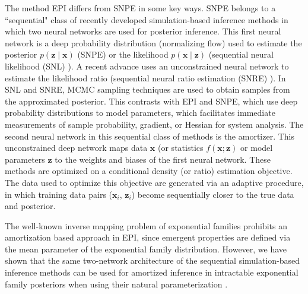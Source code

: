 \documentclass[11pt]{article}
\begin{document}
The method EPI differs from SNPE in some key ways.
SNPE belongs to a ``sequential" class of recently developed simulation-based inference methods in which two neural networks are used for posterior inference.
This first neural network is a deep probability distribution (normalizing flow) used to estimate the posterior $p(\mathbf{z} \mid \mathbf{x})$ (SNPE) or the likelihood  $p(\mathbf{x} \mid \mathbf{z})$ (sequential neural likelihood (SNL) \cite{papamakarios2019sequential}).
A recent advance uses an unconstrained neural network to estimate the likelihood ratio (sequential neural ratio estimation (SNRE) \cite{hermans2020likelihood}).
In SNL and SNRE, MCMC sampling techniques are used to obtain samples from the approximated posterior.
This contrasts with EPI and SNPE, which use deep probability distributions to model parameters, which facilitates immediate measurements of sample probability, gradient, or Hessian for system analysis.
The second neural network in this sequential class of methods is the amortizer.  This unconstrained deep network maps data $\mathbf{x}$ (or statistics $f(\mathbf{x}; \mathbf{z})$ or model parameters $\mathbf{z}$ to the weights and biases of the first neural network.
These methods are optimized on a conditional density (or ratio) estimation objective.
The data used to optimize this objective are generated via an adaptive procedure, in which training data pairs ($\mathbf{x}_i$, $\mathbf{z}_i$) become sequentially closer to the true data and posterior.

The well-known inverse mapping problem of exponential families \cite{wainwright2008graphical} prohibits an amortization based approach in EPI, since emergent properties are defined via the mean parameter of the exponential family distribution.
However, we have shown that the same two-network architecture of the sequential simulation-based inference methods can be used for amortized inference in intractable exponential family posteriors when using their natural parameterization \cite{bittner2019approximating}.
\end{document}
